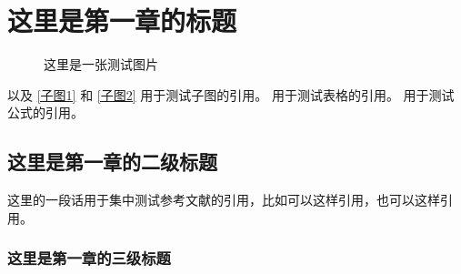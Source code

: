 \documentclass[\main/main.tex]{subfiles}
\begin{document}
\section{这里是第一章的标题}
\zhlipsum[8-9]
\begin{figure}[htb!]
  \centering
  \hspace{0.04\linewidth}
  \caption{这里是一张测试图片\cite{makise2010time}}
  \label{子图测试}
\end{figure}

 以及 \cref{子图1} 和 \cref{子图2} 用于测试子图的引用。 用于测试表格的引用。 用于测试公式的引用。

\subsection{这里是第一章的二级标题}
这里的一段话用于集中测试参考文献的引用\cite{izumi2016ero, takanashi2012eye, yano2020game}，比如可以这样引用\cite{nishimiya2016voice}，也可以这样引用\cite{rem2019maid, izumi2016ero, aqua2022idols}。

\subsubsection{这里是第一章的三级标题}
\end{document}
